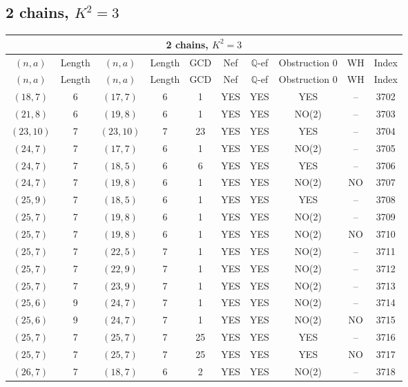 \subsection{2 chains, \(K^2 = 3\)}
\begin{longtable}{|c|c|c|c|c|c|c|c|c|c|}
\hline
\multicolumn{10}{|c|}{2 chains, $K^2 = 3$}\\
\hline
$(n,a)$ & Length & $(n,a)$ & Length & GCD & Nef & $\mathbb Q$-ef & Obstruction 0 & WH & Index\\
\hline
\endfirsthead

\hline
$(n,a)$ & Length & $(n,a)$ & Length & GCD & Nef & $\mathbb Q$-ef & Obstruction 0 & WH & Index\\
\hline
\endhead
\hline
\endfoot

$(18, 7)$ & 6 & $(17, 7)$ & 6 & 1 & YES & YES & YES & -- & 3702\\
$(21, 8)$ & 6 & $(19, 8)$ & 6 & 1 & YES & YES & NO(2) & -- & 3703\\
$(23, 10)$ & 7 & $(23, 10)$ & 7 & 23 & YES & YES & YES & -- & 3704\\
$(24, 7)$ & 7 & $(17, 7)$ & 6 & 1 & YES & YES & NO(2) & -- & 3705\\
$(24, 7)$ & 7 & $(18, 5)$ & 6 & 6 & YES & YES & YES & -- & 3706\\
$(24, 7)$ & 7 & $(19, 8)$ & 6 & 1 & YES & YES & NO(2) & NO & 3707\\
$(25, 9)$ & 7 & $(18, 5)$ & 6 & 1 & YES & YES & YES & -- & 3708\\
$(25, 7)$ & 7 & $(19, 8)$ & 6 & 1 & YES & YES & NO(2) & -- & 3709\\
$(25, 7)$ & 7 & $(19, 8)$ & 6 & 1 & YES & YES & NO(2) & NO & 3710\\
$(25, 7)$ & 7 & $(22, 5)$ & 7 & 1 & YES & YES & NO(2) & -- & 3711\\
$(25, 7)$ & 7 & $(22, 9)$ & 7 & 1 & YES & YES & NO(2) & -- & 3712\\
$(25, 7)$ & 7 & $(23, 9)$ & 7 & 1 & YES & YES & NO(2) & -- & 3713\\
$(25, 6)$ & 9 & $(24, 7)$ & 7 & 1 & YES & YES & NO(2) & -- & 3714\\
$(25, 6)$ & 9 & $(24, 7)$ & 7 & 1 & YES & YES & NO(2) & NO & 3715\\
$(25, 7)$ & 7 & $(25, 7)$ & 7 & 25 & YES & YES & YES & -- & 3716\\
$(25, 7)$ & 7 & $(25, 7)$ & 7 & 25 & YES & YES & YES & NO & 3717\\
$(26, 7)$ & 7 & $(18, 7)$ & 6 & 2 & YES & YES & NO(2) & -- & 3718\\

\end{longtable}
